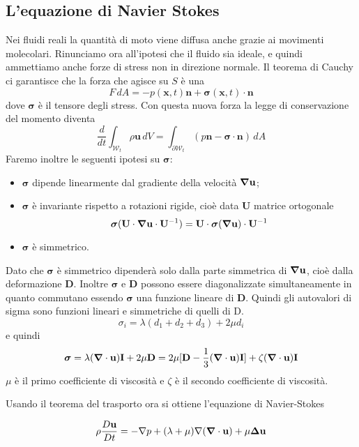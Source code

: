 \subsection{L'equazione di Navier Stokes}
Nei fluidi reali la quantità di moto viene diffusa anche grazie ai movimenti molecolari.
Rinunciamo ora all'ipotesi che il fluido sia ideale, e quindi ammettiamo anche forze di stress non in direzione normale.
Il teorema di Cauchy ci garantisce che la forza che agisce su $S$ è una 
$$F \, dA = -p(\mathbf{x},t) \mathbf{n} + \boldsymbol{\sigma}(\mathbf{x},t) \cdot \mathbf{n}$$
dove $\boldsymbol{\sigma}$ è il tensore degli stress.
Con questa nuova forza la legge di conservazione del momento diventa
$$\frac{d}{dt} \int_{\mathcal{W}_t} \rho \mathbf{u} \, dV = \int_{\partial \mathcal{W}_t} (p \mathbf{n} - \boldsymbol{\sigma} \cdot \mathbf{n} )\, dA$$
Faremo inoltre le seguenti ipotesi su $\boldsymbol{\sigma}$: \begin{itemize}
  \item $\boldsymbol{\sigma}$ dipende linearmente dal gradiente della velocità $\boldsymbol{\nabla} \mathbf{u}$;
  \item $\boldsymbol{\sigma}$ è invariante rispetto a rotazioni rigide, cioè data $\mathbf{U}$ matrice ortogonale
$$\boldsymbol{\sigma}(\mathbf{U} \cdot \boldsymbol{\nabla} \mathbf{u} \cdot \mathbf{U}^{-1}) = \mathbf{U} \cdot \boldsymbol{\sigma}( \boldsymbol{\nabla} \mathbf{u} ) \cdot \mathbf{U}^{-1}$$
\item $\boldsymbol{\sigma}$ è simmetrico.
\end{itemize} 

Dato che $\boldsymbol{\sigma}$ è simmetrico dipenderà solo dalla parte simmetrica di $\boldsymbol{\nabla} \mathbf{u}$, cioè dalla deformazione $\mathbf{D}$. Inoltre $\boldsymbol{\sigma}$ e $\mathbf{D}$ possono essere diagonalizzate simultaneamente in quanto commutano essendo $\boldsymbol{\sigma}$ una funzione lineare di $\mathbf{D}$.
Quindi gli autovalori di sigma sono funzioni lineari e simmetriche di quelli di D.
$$\sigma_i = \lambda (d_1 + d_2 + d_3) +2 \mu d_i$$
e quindi 
$$\boldsymbol{\sigma} = \lambda ( \boldsymbol{\nabla}\cdot \mathbf{u}) \mathbf{I} + 2 \mu \mathbf{D}
                                     = 2 \mu [ \mathbf{D} - \frac{1}{3} ( \boldsymbol{\nabla}\cdot \mathbf{u}) \mathbf{I} ] + \zeta ( \boldsymbol{\nabla}\cdot \mathbf{u})  \mathbf{I}
$$
$\mu$ è il primo coefficiente di viscosità e $\zeta$ è il secondo coefficiente di viscosità.

Usando il teorema del trasporto ora si ottiene l'equazione di Navier-Stokes

$$\rho \frac{D\mathbf{u}}{Dt} = -\nabla p + (\lambda+\mu) \nabla(\boldsymbol{\nabla} \cdot \mathbf{u}) + \mu \boldsymbol{\Delta} \mathbf{u}$$

